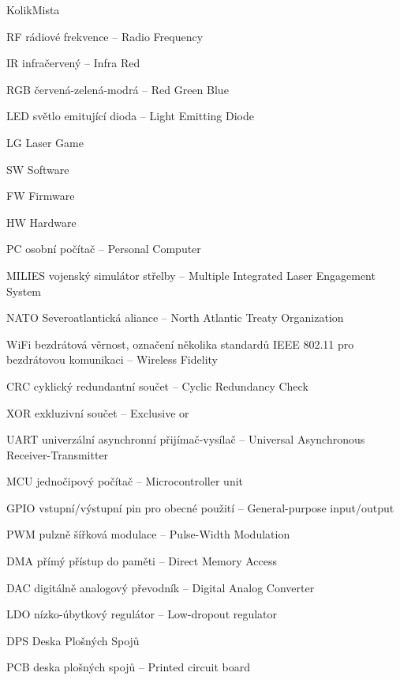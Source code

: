 \begin{seznamzkratek}{KolikMista}

    {RF}
    {rádiové frekvence -- Radio Frequency}

        {IR}
        {infračervený -- Infra Red}

        {RGB}
        {červená-zelená-modrá -- Red Green Blue}

        {LED}
        {světlo emitující dioda -- Light Emitting Diode}

        {LG}
        {Laser Game}

        {SW}
        {Software}

        {FW}
        {Firmware}

        {HW}
        {Hardware}

        {PC}
        {osobní počítač -- Personal Computer}

        {MILIES}
        {vojenský simulátor střelby -- Multiple Integrated Laser Engagement System}

        {NATO}
        {Severoatlantická aliance -- North Atlantic Treaty Organization}

        {WiFi}
        {bezdrátová věrnost, označení několika standardů IEEE 802.11 pro bezdrátovou komunikaci -- Wireless Fidelity}

        {CRC}
        {cyklický redundantní součet --  Cyclic Redundancy Check}

        {XOR}
        {exkluzivní součet --  Exclusive or}

        {UART}
        {univerzální asynchronní přijímač-vysílač --  Universal Asynchronous Receiver-Transmitter}

        {MCU}
        {jednočipový počítač --  Microcontroller unit}

        {GPIO}
        {vstupní/výstupní pin pro obecné použití --  General-purpose input/output}

        {PWM}
        {pulzně šířková modulace --  Pulse-Width Modulation}

        {DMA}
        {přímý přístup do paměti --  Direct Memory Access}

        {DAC}
        {digitálně analogový převodník --  Digital Analog Converter}

        {LDO}
        {nízko-úbytkový regulátor --  Low-dropout regulator}

        {DPS}
        {Deska Plošných Spojů}

        {PCB}
        {deska plošných spojů --  Printed circuit board}

\end{seznamzkratek}
